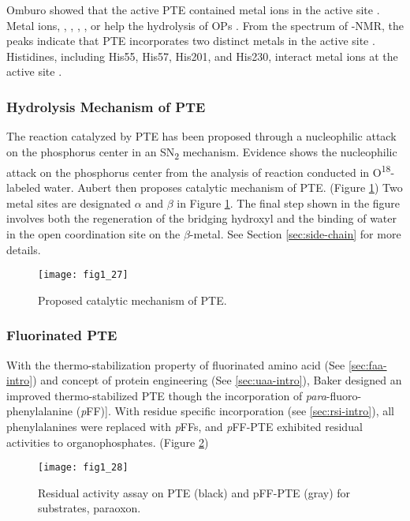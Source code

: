 \begin{refsection}
Omburo  showed that the active PTE contained metal ions in the
active site
\cite{Rochu2002b,Carletti2009,Hill2003,Bigley2013,Samples2005,Kim2008}. Metal
ions, , , , , or 
help the hydrolysis of OPs \cite{Omburo1992a}.  From the spectrum of
-NMR, the peaks indicate that PTE incorporates two distinct metals
in the active site \cite{Omburo1993}.  Histidines, including His55, His57,
His201, and His230, interact metal ions at the active site \cite{Benning2001a}. 

\subsubsection{Hydrolysis Mechanism of PTE}

The reaction catalyzed by PTE has been proposed through a nucleophilic attack
on the phosphorus center in an SN\textsubscript{2} mechanism\cite{Lewis1988}.
Evidence shows the nucleophilic attack on the phosphorus center from the
analysis of reaction conducted in O\textsuperscript{18}-labeled
water\cite{Lewis1988}.  Aubert  then proposes catalytic mechanism
of PTE\cite{Aubert2004}.  (Figure \ref{fig:pte-mechanism}) Two metal sites are
designated $\alpha$ and $\beta$ in Figure
\ref{fig:pte-mechanism}\cite{Aubert2004}. The final step shown in the figure
involves both the regeneration of the bridging hydroxyl and the binding of
water in the open coordination site on the $\beta$-metal. See Section
\ref{sec:side-chain} for more details. 
\begin{figure}[h!] \centering \texttt{[image: fig1\_27]}
    \caption[Proposed catalytic mechanism of PTE.]{Proposed catalytic mechanism
        of PTE\cite{Aubert2004}.} \label{fig:pte-mechanism} 
\end{figure}

\subsubsection{Fluorinated PTE}

With the thermo-stabilization property of fluorinated amino acid (See
\ref{sec:faa-intro}) and concept of protein engineering (See \ref{sec:uaa-intro}),
Baker  designed an improved thermo-stabilized PTE though the
incorporation of \emph{para}-fluoro-phenylalanine
(\emph{p}FF)]\cite{Baker2011b}. With residue specific incorporation (see
\ref{sec:rsi-intro}), all phenylalanines were replaced with \emph{p}FFs, and
\emph{p}FF-PTE exhibited residual activities to organophosphates. (Figure
\ref{fig:PJB})
\begin{figure}[h!] \centering \texttt{[image: fig1\_28]}
    \caption[Residual activity assay on PTE (black) and pFF-PTE (gray) for
    substrates, paraoxon.]{Residual activity assay on PTE (black) and pFF-PTE
        (gray) for substrates, paraoxon\cite{Baker2011b}.} \label{fig:PJB}
\end{figure}


\end{refsection}

